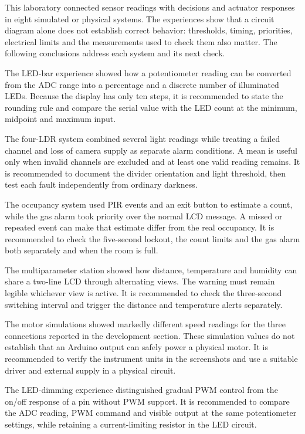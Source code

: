 This laboratory connected sensor readings with decisions and actuator responses
in eight simulated or physical systems. The experiences show that a circuit
diagram alone does not establish correct behavior: thresholds, timing,
priorities, electrical limits and the measurements used to check them also
matter. The following conclusions address each system and its next check.

The LED-bar experience showed how a potentiometer reading can be converted
from the ADC range into a percentage and a discrete number of illuminated
LEDs. Because the display has only ten steps, it is recommended to state the
rounding rule and compare the serial value with the LED count at the minimum,
midpoint and maximum input.

The four-LDR system combined several light readings while treating a failed
channel and loss of camera supply as separate alarm conditions. A mean is
useful only when invalid channels are excluded and at least one valid reading
remains. It is recommended to document the divider orientation and light
threshold, then test each fault independently from ordinary darkness.

The occupancy system used PIR events and an exit button to estimate a count,
while the gas alarm took priority over the normal LCD message. A missed or
repeated event can make that estimate differ from the real occupancy. It is
recommended to check the five-second lockout, the count limits and the gas
alarm both separately and when the room is full.

The multiparameter station showed how distance, temperature and humidity can
share a two-line LCD through alternating views. The warning must remain
legible whichever view is active. It is recommended to check the three-second
switching interval and trigger the distance and temperature alerts separately.

The motor simulations showed markedly different speed readings for the three
connections reported in the development section. These simulation values do
not establish that an Arduino output can safely power a physical motor. It is
recommended to verify the instrument units in the screenshots and use a
suitable driver and external supply in a physical circuit.

The LED-dimming experience distinguished gradual PWM control from the on/off
response of a pin without PWM support. It is recommended to compare the ADC
reading, PWM command and visible output at the same potentiometer settings,
while retaining a current-limiting resistor in the LED circuit.

